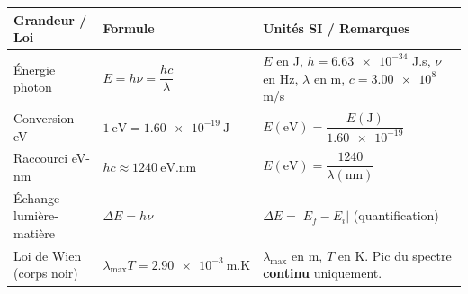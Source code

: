 \documentclass[11pt]{article}
\begin{document}
\begin{aretenir}
\begin{center}
\begin{tabularx}{\linewidth}{|l|X|X|}\hline
\textbf{Grandeur / Loi} & \textbf{Formule} & \textbf{Unités SI / Remarques} \\ \hline
Énergie photon & $E = h\nu = \dfrac{hc}{\lambda}$ & $E$ en J, $h=\num{6,63e-34}$ J.s, $\nu$ en Hz, $\lambda$ en m, $c=\num{3,00e8}$ m/s \\
Conversion eV & $1~\text{eV} = \num{1,60e-19}~\text{J}$ & $E(\text{eV}) = \dfrac{E(\text{J})}{\num{1,60e-19}}$ \\
Raccourci eV-nm & $hc \approx 1240~\text{eV.nm}$ & $E(\text{eV}) = \dfrac{1240}{\lambda(\text{nm})}$ \\
Échange lumière-matière & $\Delta E = h\nu$ & $\Delta E = |E_f - E_i|$ (quantification) \\
Loi de Wien (corps noir) & $\lambda_{\max} T = \num{2,90e-3}~\text{m.K}$ & $\lambda_{\max}$ en m, $T$ en K. Pic du spectre \textbf{continu} uniquement. \\ \hline
\end{tabularx}
\end{center}
\end{aretenir}
\end{document}
